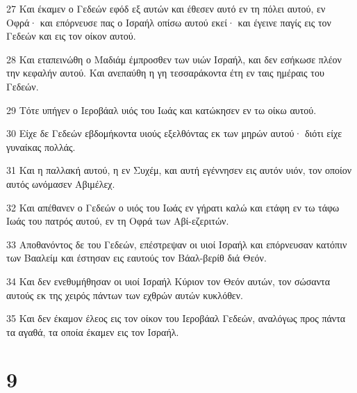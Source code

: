 \par 27 Και έκαμεν ο Γεδεών εφόδ εξ αυτών και έθεσεν αυτό εν τη πόλει αυτού, εν Οφρά· και επόρνευσε πας ο Ισραήλ οπίσω αυτού εκεί· και έγεινε παγίς εις τον Γεδεών και εις τον οίκον αυτού.
\par 28 Και εταπεινώθη ο Μαδιάμ έμπροσθεν των υιών Ισραήλ, και δεν εσήκωσε πλέον την κεφαλήν αυτού. Και ανεπαύθη η γη τεσσαράκοντα έτη εν ταις ημέραις του Γεδεών.
\par 29 Τότε υπήγεν ο Ιεροβάαλ υιός του Ιωάς και κατώκησεν εν τω οίκω αυτού.
\par 30 Είχε δε Γεδεών εβδομήκοντα υιούς εξελθόντας εκ των μηρών αυτού· διότι είχε γυναίκας πολλάς.
\par 31 Και η παλλακή αυτού, η εν Συχέμ, και αυτή εγέννησεν εις αυτόν υιόν, τον οποίον αυτός ωνόμασεν Αβιμέλεχ.
\par 32 Και απέθανεν ο Γεδεών ο υιός του Ιωάς εν γήρατι καλώ και ετάφη εν τω τάφω Ιωάς του πατρός αυτού, εν τη Οφρά των Αβί-εζεριτών.
\par 33 Αποθανόντος δε του Γεδεών, επέστρεψαν οι υιοί Ισραήλ και επόρνευσαν κατόπιν των Βααλείμ και έστησαν εις εαυτούς τον Βάαλ-βερίθ διά Θεόν.
\par 34 Και δεν ενεθυμήθησαν οι υιοί Ισραήλ Κύριον τον Θεόν αυτών, τον σώσαντα αυτούς εκ της χειρός πάντων των εχθρών αυτών κυκλόθεν.
\par 35 Και δεν έκαμον έλεος εις τον οίκον του Ιεροβάαλ Γεδεών, αναλόγως προς πάντα τα αγαθά, τα οποία έκαμεν εις τον Ισραήλ.

\chapter{9}

